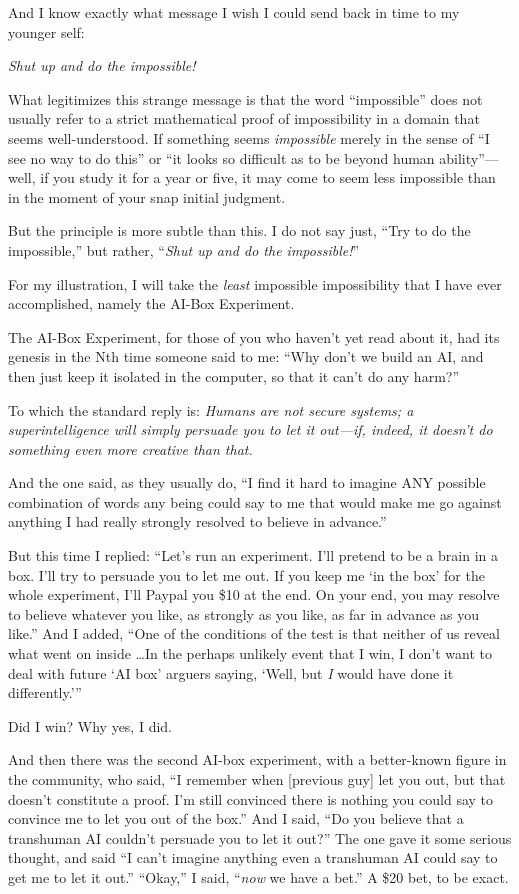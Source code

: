 {
 And I know exactly what message I wish I could send back in time
to my younger self:}

{
 \textit{Shut up and do the impossible!}}

{
 What legitimizes this strange message is that the word
``impossible'' does not usually
refer to a strict mathematical proof of impossibility in a domain that
seems well-understood. If something seems \textit{impossible} merely in
the sense of ``I see no way to do
this'' or ``it looks so difficult as
to be beyond human ability''---well, if you study it
for a year or five, it may come to seem less impossible than in the
moment of your snap initial judgment.}

{
 But the principle is more subtle than this. I do not say just,
``Try to do the impossible,'' but
rather, ``\textit{Shut up and do the
impossible!}''}

{
 For my illustration, I will take the \textit{least} impossible
impossibility that I have ever accomplished, namely the AI-Box
Experiment.}

{
 The AI-Box Experiment, for those of you who
haven't yet read about it, had its genesis in the Nth
time someone said to me: ``Why don't
we build an AI, and then just keep it isolated in the computer, so that
it can't do any harm?''}

{
 To which the standard reply is: \textit{Humans are not secure
systems; a superintelligence will simply persuade you to let it
out---if, indeed, it doesn't do something even more
creative than that.}}

{
 And the one said, as they usually do, ``I find it
hard to imagine ANY possible combination of words any being could say
to me that would make me go against anything I had really strongly
resolved to believe in advance.''}

{
 But this time I replied: ``Let's
run an experiment. I'll pretend to be a brain in a box.
I'll try to persuade you to let me out. If you keep me
`in the box' for the whole experiment,
I'll Paypal you \$10 at the end. On your end, you may
resolve to believe whatever you like, as strongly as you like, as far
in advance as you like.'' And I added,
``One of the conditions of the test is that neither of
us reveal what went on inside \ldots In the perhaps unlikely event that
I win, I don't want to deal with future
`AI box' arguers saying,
`Well, but \textit{I} would have done it
differently.'''}

{
 Did I win? Why yes, I did.}

{
 And then there was the second AI-box experiment, with a
better-known figure in the community, who said, ``I
remember when [previous guy] let you out, but that
doesn't constitute a proof. I'm still
convinced there is nothing you could say to convince me to let you out
of the box.'' And I said, ``Do you
believe that a transhuman AI couldn't persuade you to
let it out?'' The one gave it some serious thought,
and said ``I can't imagine anything
even a transhuman AI could say to get me to let it
out.'' ``Okay,'' I
said, ``\textit{now} we have a
bet.'' A \$20 bet, to be exact.}


